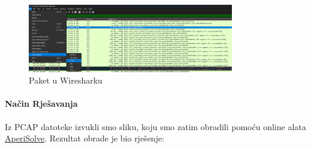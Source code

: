 \documentclass{article}
\begin{document}
\begin{figure}[H]
    \centering
    \includegraphics[width=0.8\textwidth]{wiresharkClock.png}
    \caption{Paket u Wiresharku}
    \label{fig:pckt_wireshark_Clock}
\end{figure}

\paragraph{Način Rješavanja}
Iz PCAP datoteke izvukli smo sliku, koju smo zatim obradili pomoću online alata \href{https://www.aperisolve.com/}{AperiSolve}. Rezultat obrade je bio rješenje:
\end{document}
